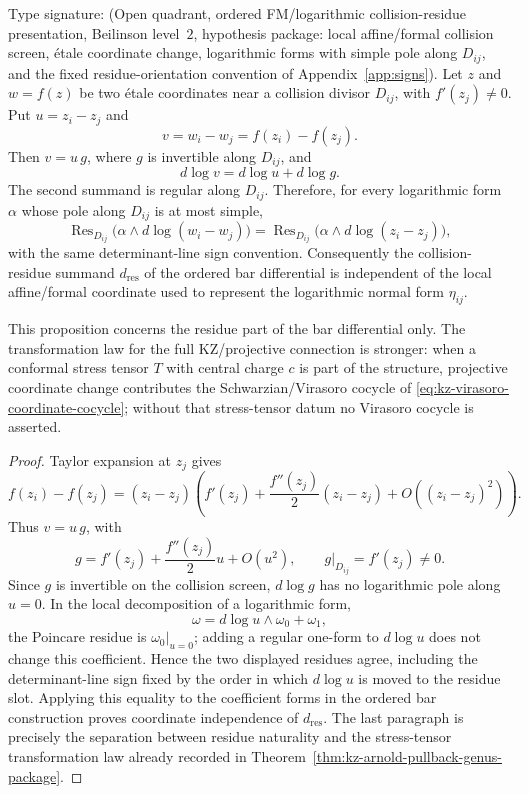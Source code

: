 \begin{proposition}
\label{prop:bar-residue-coordinate-independence}
Type signature: \textup{(}Open quadrant, ordered FM/logarithmic
collision-residue presentation, Beilinson level~$2$, hypothesis
package: local affine/formal collision screen, \'{e}tale coordinate
change, logarithmic forms with simple pole along \(D_{ij}\), and the
fixed residue-orientation convention of
Appendix~\ref{app:signs}\textup{)}.
Let \(z\) and \(w=f(z)\) be two \'{e}tale coordinates near a collision
divisor \(D_{ij}\), with \(f'(z_j)\ne0\).  Put \(u=z_i-z_j\) and
\[
v=w_i-w_j=f(z_i)-f(z_j).
\]
Then \(v=u\,g\), where \(g\) is invertible along \(D_{ij}\), and
\[
d\log v=d\log u+d\log g .
\]
The second summand is regular along \(D_{ij}\).  Therefore, for every
logarithmic form \(\alpha\) whose pole along \(D_{ij}\) is at most
simple,
\[
\operatorname{Res}_{D_{ij}}\!\bigl(\alpha\wedge d\log(w_i-w_j)\bigr)
=
\operatorname{Res}_{D_{ij}}\!\bigl(\alpha\wedge d\log(z_i-z_j)\bigr),
\]
with the same determinant-line sign convention.  Consequently the
collision-residue summand \(d_{\mathrm{res}}\) of the ordered bar
differential is independent of the local affine/formal coordinate used
to represent the logarithmic normal form \(\eta_{ij}\).

This proposition concerns the residue part of the bar differential
only.  The transformation law for the full KZ/projective connection is
stronger: when a conformal stress tensor \(T\) with central charge \(c\)
is part of the structure, projective coordinate change contributes the
Schwarzian/Virasoro cocycle of
\eqref{eq:kz-virasoro-coordinate-cocycle}; without that stress-tensor
datum no Virasoro cocycle is asserted.
\end{proposition}

\begin{proof}
Taylor expansion at \(z_j\) gives
\[
f(z_i)-f(z_j)
=
(z_i-z_j)
\left(
 f'(z_j)+\frac{f''(z_j)}{2}(z_i-z_j)+O((z_i-z_j)^2)
\right).
\]
Thus \(v=u\,g\), with
\[
g=f'(z_j)+\frac{f''(z_j)}{2}u+O(u^2),
\qquad
g|_{D_{ij}}=f'(z_j)\ne0 .
\]
Since \(g\) is invertible on the collision screen, \(d\log g\) has no
logarithmic pole along \(u=0\).  In the local decomposition of a
logarithmic form,
\[
\omega=d\log u\wedge \omega_0+\omega_1,
\]
the Poincare residue is \(\omega_0|_{u=0}\); adding a regular
one-form to \(d\log u\) does not change this coefficient.  Hence the
two displayed residues agree, including the determinant-line sign
fixed by the order in which \(d\log u\) is moved to the residue slot.
Applying this equality to the coefficient forms in the ordered bar
construction proves coordinate independence of \(d_{\mathrm{res}}\).
The last paragraph is precisely the separation between residue
naturality and the stress-tensor transformation law already recorded
in Theorem~\ref{thm:kz-arnold-pullback-genus-package}.
\end{proof}

